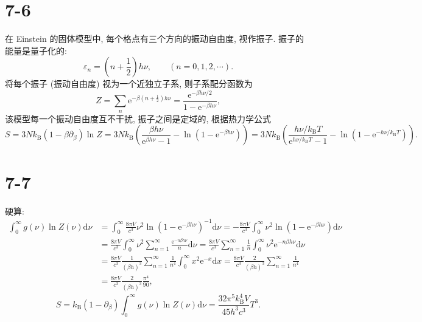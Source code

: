 \documentclass[
    lang=cn,
    column=onecolumn
]{spArticle}
\begin{document}
    \section{7-6}
        在 Einstein 的固体模型中, 每个格点有三个方向的振动自由度, 视作振子. 振子的能量是量子化的:
        $$
        \varepsilon _n=\left( n+\frac{1}{2} \right) h\nu ,\qquad \left( n=0,1,2,\cdots \right) .
        $$
        将每个振子 (振动自由度) 视为一个近独立子系, 则子系配分函数为
        $$
        Z=\sum_n{\mathrm{e}^{-\beta \left( n+\frac{1}{2} \right) h\nu}}=\frac{\mathrm{e}^{-\beta h\nu /2}}{1-\mathrm{e}^{-\beta h\nu}},
        $$
        该模型每一个振动自由度互不干扰, 振子之间是定域的, 根据热力学公式
        $$
        S=3Nk_{\mathrm{B}}\left( 1-\beta \partial _{\beta} \right) \ln Z=3Nk_{\mathrm{B}}\left( \frac{\beta h\nu}{\mathrm{e}^{\beta h\nu}-1}-\ln \left( 1-\mathrm{e}^{-\beta h\nu} \right) \right) =3Nk_{\mathrm{B}}\left( \frac{h\nu /k_{\mathrm{B}}T}{\mathrm{e}^{h\nu /k_{\mathrm{B}}T}-1}-\ln \left( 1-\mathrm{e}^{-h\nu /k_{\mathrm{B}}T} \right) \right) .
        $$
    \section{7-7}
        硬算:
        \begin{align*}
            \int_0^{\infty}{g\left( \nu \right) \ln Z\left( \nu \right) \mathrm{d}\nu}&=\int_0^{\infty}{\frac{8\pi V}{c^3}\nu ^2\ln \left( 1-\mathrm{e}^{-\beta h\nu} \right) ^{-1}\mathrm{d}\nu}=-\frac{8\pi V}{c^3}\int_0^{\infty}{\nu ^2\ln \left( 1-\mathrm{e}^{-\beta h\nu} \right) \mathrm{d}\nu}
            \\
            &=\frac{8\pi V}{c^3}\int_0^{\infty}{\nu ^2\sum_{n=1}^{\infty}{\frac{\mathrm{e}^{-n\beta h\nu}}{n}}\mathrm{d}\nu}=\frac{8\pi V}{c^3}\sum_{n=1}^{\infty}{\frac{1}{n}\int_0^{\infty}{\nu ^2\mathrm{e}^{-n\beta h\nu}\mathrm{d}\nu}}
            \\
            &=\frac{8\pi V}{c^3}\frac{1}{\left( \beta h \right) ^3}\sum_{n=1}^{\infty}{\frac{1}{n^4}\int_0^{\infty}{x^2\mathrm{e}^{-x}\mathrm{d}x}}=\frac{8\pi V}{c^3}\frac{2}{\left( \beta h \right) ^3}\sum_{n=1}^{\infty}{\frac{1}{n^4}}
            \\
            &=\frac{8\pi V}{c^3}\frac{2}{\left( \beta h \right) ^3}\frac{\pi ^4}{90},
        \end{align*}
        $$
        S=k_{\mathrm{B}}\left( 1-\partial _{\beta} \right) \int_0^{\infty}{g\left( \nu \right) \ln Z\left( \nu \right) \mathrm{d}\nu}=\frac{32\pi ^5k_{\mathrm{B}}^{4}V}{45h^3c^3}T^3.
        $$
\end{document}
